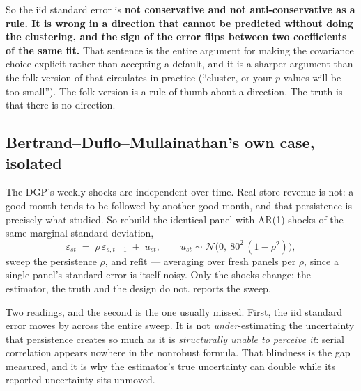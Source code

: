 So the iid standard error is \textbf{not conservative and not anti-conservative as a rule. It is
wrong in a direction that cannot be predicted without doing the clustering, and the sign of the
error flips between two coefficients of the same fit.} That sentence is the entire argument for
making the covariance choice explicit rather than accepting a default, and it is a sharper argument
than the folk version of \citet{bertrand2004} that circulates in practice (``cluster, or your
$p$-values will be too small''). The folk version is a rule of thumb about a direction. The truth
is that there is no direction.

\subsection*{Bertrand--Duflo--Mullainathan's own case, isolated}

The DGP's weekly shocks are independent over time. Real store revenue is not: a good month tends to
be followed by another good month, and that persistence is precisely what \citet{bertrand2004}
studied. So rebuild the identical panel with AR(1) shocks of the same marginal standard deviation,
%
\begin{equation}
  \varepsilon_{st} \;=\; \rho \, \varepsilon_{s,t-1} \;+\; u_{st},
  \qquad
  u_{st} \sim \mathcal N\!\Big(0,\ 80^{2}\,(1 - \rho^{2})\Big),
  \label{eq:did:ar1}
\end{equation}
%
sweep the persistence $\rho$, and refit --- averaging over \nbEightAroneNPanels{} fresh panels per
$\rho$, since a single panel's standard error is itself noisy. Only the shocks change; the
estimator, the truth and the design do not.  reports the sweep.



Two readings, and the second is the one usually missed. First, the iid standard error moves by
\eur{\nbEightAroneIidSpread} across the entire sweep. It is not \emph{under}-estimating the
uncertainty that persistence creates so much as it is \emph{structurally unable to perceive it}:
serial correlation appears nowhere in the nonrobust formula. That blindness is the gap
\citeauthor{bertrand2004} measured, and it is why the estimator's true uncertainty can double while
its reported uncertainty sits unmoved.

